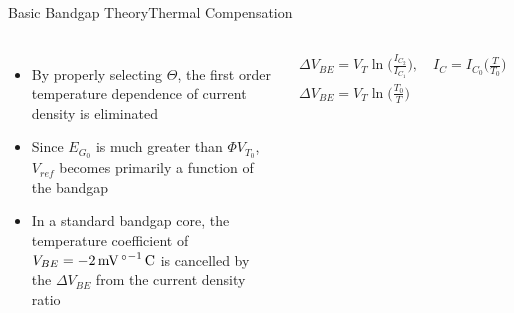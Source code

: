 \documentclass[aspectratio=1610]{beamer} %
\begin{document}
\begin{frame}{Basic Bandgap Theory}{Thermal Compensation}

        \begin{columns}[c]
            \begin{itemize}
                \item By properly selecting \(\Theta\), the first order temperature dependence of current density is eliminated
                \item Since \(E_{G_0}\) is much greater than \(\Phi V_{T_0}\), \(V_{ref}\) becomes primarily a function of the bandgap
                \item In a standard bandgap core, the temperature coefficient of \(V_{BE} = \qty{-2}{\mV\per\degree\C}\) is cancelled by the \(\Delta V_{BE}\) from the current density ratio~\cite{Widlar1967,Pease1990}
            \end{itemize}
        
            \small
            \begin{gather}
                \Delta V_{BE} = V_T \ln{\Biggl(\frac{I_{C_2}}{I_{C_1}}\Biggr)}, \quad I_C = I_{C_0}\biggl(\frac{T}{T_0}\biggr) \nonumber \\
                \Delta V_{BE} = V_T \ln{\biggl(\frac{T_0}{T}\biggr)} \label{eq:d_vbe}
            \end{gather}
        \end{columns}
\end{frame}
\end{document}
